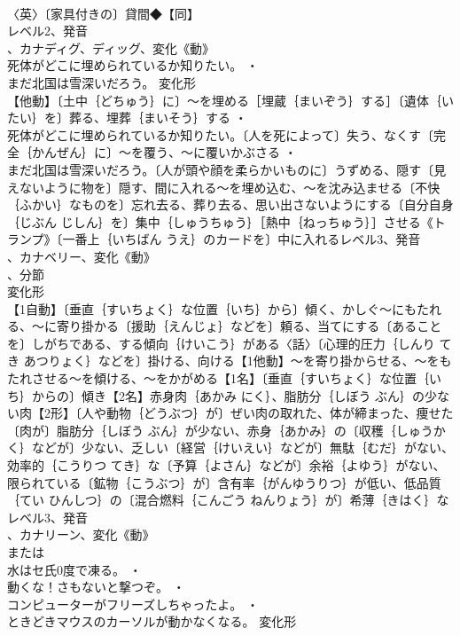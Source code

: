 \documentclass[8pt]{extreport}
\begin{document}
\begin{CJK}{UTF8}{min}
\\	〈英〉〔家具付きの〕貸間◆【同】
\\	レベル2、発音
\\	、カナディグ、ディッグ、変化《動》
\\	死体がどこに埋められているか知りたい。 ・
\\	まだ北国は雪深いだろう。	変化形 
\\	【他動】〔土中｛どちゅう｝に〕～を埋める［埋蔵｛まいぞう｝する］〔遺体｛いたい｝を〕葬る、埋葬｛まいそう｝する ・
\\	死体がどこに埋められているか知りたい。〔人を死によって〕失う、なくす〔完全｛かんぜん｝に〕～を覆う、～に覆いかぶさる ・
\\	まだ北国は雪深いだろう。〔人が頭や顔を柔らかいものに〕うずめる、隠す〔見えないように物を〕隠す、間に入れる～を埋め込む、～を沈み込ませる〔不快｛ふかい｝なものを〕忘れ去る、葬り去る、思い出さないようにする〔自分自身｛じぶん じしん｝を〕集中｛しゅうちゅう｝［熱中｛ねっちゅう｝］させる《トランプ》〔一番上｛いちばん うえ｝のカードを〕中に入れるレベル3、発音
\\	、カナベリー、変化《動》
\\	、分節
\\	変化形 
\\	【1自動】〔垂直｛すいちょく｝な位置｛いち｝から〕傾く、かしぐ～にもたれる、～に寄り掛かる〔援助｛えんじょ｝などを〕頼る、当てにする〔あることを〕しがちである、する傾向｛けいこう｝がある〈話〉〔心理的圧力｛しんり てき あつりょく｝などを〕掛ける、向ける【1他動】～を寄り掛からせる、～をもたれさせる～を傾ける、～をかがめる【1名】〔垂直｛すいちょく｝な位置｛いち｝からの〕傾き【2名】赤身肉｛あかみ にく｝、脂肪分｛しぼう ぶん｝の少ない肉【2形】〔人や動物｛どうぶつ｝が〕ぜい肉の取れた、体が締まった、痩せた〔肉が〕脂肪分｛しぼう ぶん｝が少ない、赤身｛あかみ｝の〔収穫｛しゅうかく｝などが〕少ない、乏しい〔経営｛けいえい｝などが〕無駄｛むだ｝がない、効率的｛こうりつ てき｝な〔予算｛よさん｝などが〕余裕｛よゆう｝がない、限られている〔鉱物｛こうぶつ｝が〕含有率｛がんゆうりつ｝が低い、低品質｛てい ひんしつ｝の〔混合燃料｛こんごう ねんりょう｝が〕希薄｛きはく｝なレベル3、発音
\\	、カナリーン、変化《動》
\\	または
\\	水はセ氏0度で凍る。 ・
\\	動くな！さもないと撃つぞ。 ・
\\	コンピューターがフリーズしちゃったよ。 ・
\\	ときどきマウスのカーソルが動かなくなる。	変化形 

\end{CJK}
\end{document}
